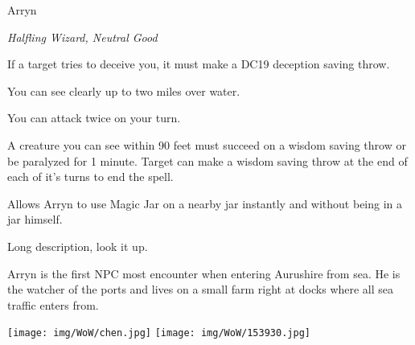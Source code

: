 \begin{monsterbox}{Arryn}
	\begin{hangingpar}
		\textit{Halfling Wizard, Neutral Good}
	\end{hangingpar}
	\dndline%
	\basics[%
	armorclass = 17,
	hitpoints  = 172,
	speed      = 40 ft
	]
	\dndline%
	\stats[
	STR = \stat{12}, %
	DEX = \stat{12},
	CON = \stat{16},
	INT = \stat{20},
	WIS = \stat{18},
	CHA = \stat{18}
	]
	\dndline%
	\details[%
	languages = {Common, Elvish, Dwarvish, Gnomish, Halfling, Orc, Pandaren},
	challenge = 10
	]
	\dndline%
	\begin{monsteraction}
		If a target tries to deceive you, it must make a DC19 deception saving throw.
	\end{monsteraction}	
	\begin{monsteraction}
		You can see clearly up to two miles over water.
	\end{monsteraction}
	\begin{monsteraction}
		You can attack twice on your turn.
	\end{monsteraction}
	\begin{monsteraction}
		A creature you can see within 90 feet must succeed on a wisdom saving throw or be paralyzed for 1 minute. Target can make a wisdom saving throw at the end of each of it's turns to end the spell.
	\end{monsteraction}
	\begin{monsteraction}
		Allows Arryn to use Magic Jar on a nearby jar instantly and without being in a jar himself.
	\end{monsteraction}
	\begin{monsteraction}
		Long description, look it up.
	\end{monsteraction}
	Arryn is the first NPC most encounter when entering Aurushire from sea. He is the watcher of the ports and lives on a small farm right at docks where all sea traffic enters from.
\end{monsterbox}

\begin{center}
	\texttt{[image: img/WoW/chen.jpg]} \texttt{[image: img/WoW/153930.jpg]}
\end{center}

